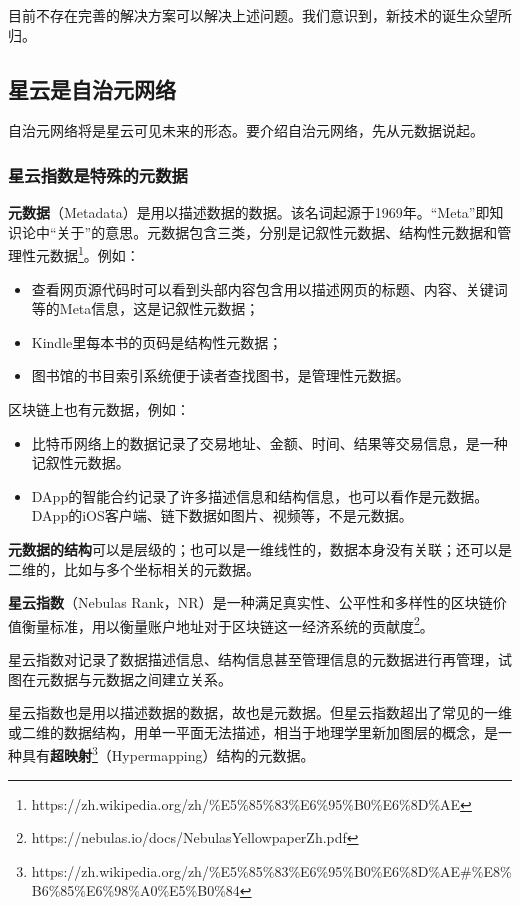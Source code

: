 目前不存在完善的解决方案可以解决上述问题。我们意识到，新技术的诞生众望所归。



\subsection{星云是自治元网络}
自治元网络将是星云可见未来的形态。要介绍自治元网络，先从元数据说起。
\subsubsection{星云指数是特殊的元数据}
\textbf{元数据}（Metadata）是用以描述数据的数据。该名词起源于1969年。“Meta”即知识论中“关于”的意思。元数据包含三类，分别是记叙性元数据、结构性元数据和管理性元数据\footnote{https://zh.wikipedia.org/zh/\%E5\%85\%83\%E6\%95\%B0\%E6\%8D\%AE}。例如：
\begin{itemize}
\item 查看网页源代码时可以看到头部内容包含用以描述网页的标题、内容、关键词等的Meta信息，这是记叙性元数据；
\item Kindle里每本书的页码是结构性元数据；
\item 图书馆的书目索引系统便于读者查找图书，是管理性元数据。
\end{itemize}
区块链上也有元数据，例如：
\begin{itemize}
\item 比特币网络上的数据记录了交易地址、金额、时间、结果等交易信息，是一种记叙性元数据。
\item DApp的智能合约记录了许多描述信息和结构信息，也可以看作是元数据。DApp的iOS客户端、链下数据如图片、视频等，不是元数据。
\end{itemize}

\textbf{元数据的结构}可以是层级的；也可以是一维线性的，数据本身没有关联；还可以是二维的，比如与多个坐标相关的元数据。



\textbf{星云指数}（Nebulas Rank，NR）是一种满足真实性、公平性和多样性的区块链价值衡量标准，用以衡量账户地址对于区块链这一经济系统的贡献度\footnote{https://nebulas.io/docs/NebulasYellowpaperZh.pdf}。

星云指数对记录了数据描述信息、结构信息甚至管理信息的元数据进行再管理，试图在元数据与元数据之间建立关系。

星云指数也是用以描述数据的数据，故也是元数据。但星云指数超出了常见的一维或二维的数据结构，用单一平面无法描述，相当于地理学里新加图层的概念，是一种具有\textbf{超映射}\footnote{https://zh.wikipedia.org/zh/\%E5\%85\%83\%E6\%95\%B0\%E6\%8D\%AE\#\%E8\%B6\%85\%E6\%98\%A0\%E5\%B0\%84}（Hypermapping）结构的元数据。

